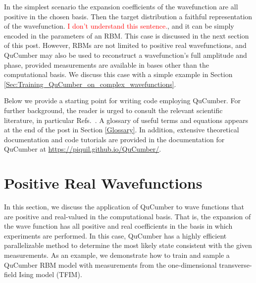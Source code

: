 \documentclass[submission, Phys]{SciPost}
\begin{document}

In the simplest scenario the expansion coefficients of the wavefunction are all positive in the chosen basis.
Then the target distribution a faithful representation of the wavefunction. \textcolor{red}{I don't understand this sentence.}, and it can be simply encoded in the parameters of an RBM.
This case is discussed in the next section of this post. However, RBMs are not limited to positive real wavefunctions,
and QuCumber may also be used to reconstruct a wavefunction's full amplitude and phase, provided measurements are available in bases other than the computational basis.
We discuss this case with a simple example in Section \ref{Sec:Training_QuCumber_on_complex_wavefunctions}.

Below we provide a starting point for writing code employing QuCumber.
For further background, the reader is urged to consult the relevant scientific literature, in particular Refs.~\cite{Torlai2016thermo, torlai2018tomography}.
A glossary of useful terms and equations appears at the end of the post in Section \ref{Glossary}.
In addition, extensive theoretical documentation and code tutorials are provided in the documentation for QuCumber at \url{https://piquil.github.io/QuCumber/}.


\section{Positive Real Wavefunctions}

In this section, we discuss the application of QuCumber to wave functions that are positive and real-valued in the computational basis.
That is, the expansion of the wave function has all positive and real coefficients in the basis in which experiments are performed.
In this case, QuCumber has a highly efficient parallelizable method to determine the most likely state consistent with the given measurements.
As an example, we demonstrate how to train and sample a QuCumber RBM model with measurements from the one-dimensional transverse-field Ising model (TFIM).
\end{document}
